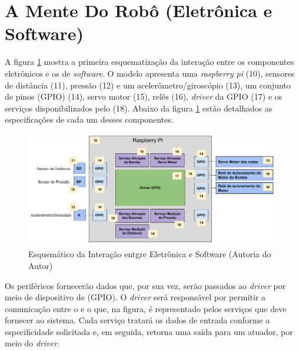 \section{A Mente Do Robô (Eletrônica e Software)} \label{sec:mind-robot}
A figura \ref{fig:schema-interactive-electro-soft} mostra a primeira esquematização
da interação entre os componentes eletrônicos e os de \textit{software}. O modelo
apresenta uma \textit{raspberry pi} (10), sensores de distância (11), pressão (12) e
um acelerômetro/giroscópio (13), um conjunto de pinos (GPIO) (14), servo motor (15),
relês (16), \textit{driver} da GPIO (17) e os serviços disponibilizados pelo \software  (18).
Abaixo da figura \ref{fig:schema-interactive-electro-soft} estão detalhados as especificações
de cada um desses componentes.
\par
\begin{figure}[h]
  \centering
  \includegraphics[width=\textwidth]{figures/schema-interactive-eletro-soft.png}
  \caption{Esquemático da Interação entgre Eletrônica e Software (\textsf{Autoria do Autor})}
  \label{fig:schema-interactive-electro-soft}
\end{figure}
\FloatBarrier
\par
Os periféricos fornecerão dados que, por sua vez, serão passados ao \textit{driver} por
meio de dispositivo de \hardware (GPIO).  O \textit{driver} será responsável por permitir
a comunicação entre o \hardware e o \software que, na figura, é representado pelos
serviços que deve fornecer ao sistema. Cada serviço tratará os dados de entrada
conforme a especificidade solicitada e, em seguida, retorna uma saída para um
atuador, por meio do \textit{driver}.
\par
